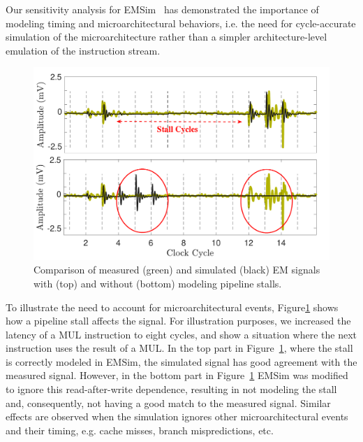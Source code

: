 Our sensitivity analysis for EMSim~\cite{Nader2020} has demonstrated the importance of modeling timing and microarchitectural behaviors, i.e. the need for cycle-accurate simulation of the microarchitecture rather than a simpler architecture-level emulation of the instruction stream.

\begin{figure}
	\centering
		\vspace{-0.15in}
	\includegraphics[width=0.45\columnwidth,clip]{figure/stall2.pdf}
	\vspace{-0.3in}
	\caption{Comparison of measured (green) and simulated (black) EM signals with (top) and without (bottom) modeling pipeline stalls.}
	\label{fig:stall}
\end{figure}
To illustrate the need to account for microarchitectural events, Figure\ref{fig:stall} shows how a pipeline stall affects the signal. For illustration purposes, we increased the latency of a MUL instruction to eight cycles, and show a situation where the next instruction uses the result of a MUL. In the top part in Figure~\ref{fig:stall}, where the stall is correctly modeled in EMSim, the simulated signal has good agreement with the measured signal. However, in the bottom part in Figure~\ref{fig:stall} EMSim was modified to ignore this read-after-write dependence, resulting in not modeling the stall and, consequently, not having a good match to the measured signal.
Similar effects are observed when the simulation ignores other microarchitectural events and their timing, e.g. cache misses, branch mispredictions, etc.

